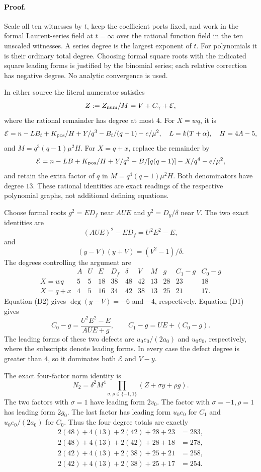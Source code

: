 \paragraph{Proof.}
Scale all ten witnesses by $t$, keep the coefficient ports fixed, and
work in the formal Laurent-series field at $t=\infty$ over the rational
function field in the ten unscaled witnesses.  A series degree is the
largest exponent of $t$.  For polynomials it is their ordinary total
degree.  Choosing formal square roots with the indicated square leading
forms is justified by the binomial series; each relative correction
has negative degree.  No analytic convergence is used.

In either source the literal numerator satisfies
\[
 Z:=Z_{\rm num}/M=V+C_\gamma+\mathcal E,
\]
where the rational remainder has degree at most $4$.
For $X=wq$, it is
\[
 \mathcal E=n-LB_t+K_{\rm pos}/H+Y/q^3-B_t/(q-1)-e/\mu^2,
 \quad L=k(T+\alpha),\quad H=4A-5,
\]
and $M=q^3(q-1)\mu^2H$.
For $X=q+x$, replace the remainder by
\[
 \mathcal E=n-LB+K_{\rm pos}/H+Y/q^3
                -B/[q(q-1)]-X/q^4-e/\mu^2,
\]
and retain the extra factor of $q$ in
$M=q^4(q-1)\mu^2H$.  Both denominators have degree $13$.
These rational identities are exact readings of the respective
polynomial graphs, not additional defining equations.

Choose formal roots $g^2=ED_f$ near $AUE$ and
$y^2=D_y/\delta$ near $V$.  The two exact identities are
\[
 (AUE)^2-ED_f=U^2E^2-E,                         \tag{D1}
\]
and
\[
 (y-V)(y+V)=(V^2-1)/\delta.                       \tag{D2}
\]
The degrees controlling the argument are
\[
\begin{array}{c|rrrrrrrrrr}
 &A&U&E&D_f&\delta&V&M&g&C_1-g&C_0-g\\\hline
 X=wq&5&5&18&38&48&42&13&28&23&18\\
 X=q+x&4&5&16&34&42&38&13&25&21&17.
\end{array}
\]
Equation (D2) gives $\deg(y-V)=-6$ and $-4$, respectively.
Equation (D1) gives
\[
 C_0-g=\frac{U^2E^2-E}{AUE+g},
 \qquad C_1-g=UE+(C_0-g).
\]
The leading forms of these two defects are $u_0e_0/(2a_0)$ and
$u_0e_0$, respectively, where the subscripts denote leading forms.
In every case the defect degree is greater than $4$, so it dominates
both $\mathcal E$ and $V-y$.

The exact four-factor norm identity is
\[
 N_2=\delta^2M^4
       \prod_{\sigma,\rho\in\{-1,1\}}(Z+\sigma y+\rho g).
                                                               \tag{D3}
\]
The two factors with $\sigma=1$ have leading form $2v_0$.
The factor with $\sigma=-1,\rho=1$ has leading form $2g_0$.
The last factor has leading form $u_0e_0$ for $C_1$ and
$u_0e_0/(2a_0)$ for $C_0$.
Thus the four degree totals are exactly
\begin{align*}
 2(48)+4(13)+2(42)+28+23&=283,\\
 2(48)+4(13)+2(42)+28+18&=278,\\
 2(42)+4(13)+2(38)+25+21&=258,\\
 2(42)+4(13)+2(38)+25+17&=254.
\end{align*}

